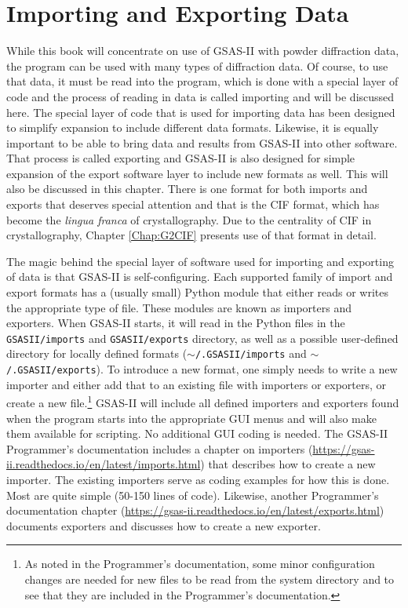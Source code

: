 \chapter{Importing and Exporting Data}\label{Chap:ImportExport}

While this book will concentrate on use of GSAS-II with powder diffraction data, the program can be used with many types of diffraction data. Of course, to use that data, it must be read into the program, which is done with a special layer of code and the process of reading in data is called importing and will be discussed here. The special layer of code that is used for importing data has been designed to simplify  expansion to include different data formats.  Likewise, it is equally important to be able to bring data and results from GSAS-II into other software. That process is called exporting and GSAS-II is also designed for simple expansion of the export software layer to include new formats as well. This will also be discussed in this chapter. There is one format for both imports and exports that deserves special attention and that is the CIF format, which has become the \textit{lingua franca} of crystallography. Due to the centrality of CIF in crystallography, Chapter \ref{Chap:G2CIF} presents use of that format in detail. 

The magic behind the special layer of software used for importing and exporting of data is that GSAS-II is self-configuring. Each supported family of import and export formats has a (usually small) Python module that either reads or writes the appropriate type of file. These modules are known as importers and exporters. When GSAS-II starts, it will read in the Python files in the \texttt{GSASII/imports} and \texttt{GSASII/exports} directory, as well as a possible user-defined directory for locally defined formats (\texttt{$\sim$/.GSASII/imports} and \texttt{$\sim$/.GSASII/exports}). To introduce a new format, one simply needs to write a new importer and either add that to an existing file with importers or exporters, or create a new file.\footnote{As noted in the Programmer's documentation, some minor configuration changes are needed for new files to be read from the system directory and to see that they are included in the Programmer's documentation.}
GSAS-II will include all defined importers and exporters found when the program starts into the appropriate GUI menus and will also make them available for scripting. No additional GUI coding is needed.  The GSAS-II Programmer's documentation includes a chapter on importers (\url{https://gsas-ii.readthedocs.io/en/latest/imports.html}) that describes how to create a new importer. The existing importers serve as coding examples for how this is done. Most are quite simple (50-150 lines of code). Likewise, another Programmer's documentation chapter (\url{https://gsas-ii.readthedocs.io/en/latest/exports.html}) documents exporters and discusses how to create a new exporter. 

